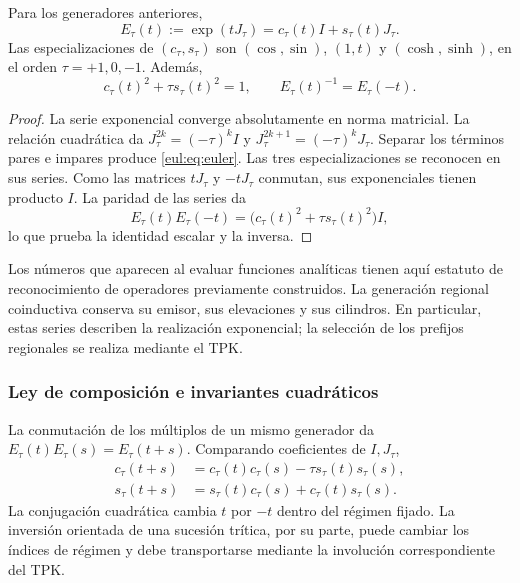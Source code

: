 \begin{teorema}
\label{eul:teo:euler}
Para los generadores anteriores,
\begin{equation}
 E_\tau(t):=\exp(tJ_\tau)
 =c_\tau(t)I+s_\tau(t)J_\tau.
\label{eul:eq:euler}
\end{equation}
Las especializaciones de \((c_\tau,s_\tau)\) son
\((\cos,\sin)\), \((1,t)\) y \((\cosh,\sinh)\), en el orden
\(\tau=+1,0,-1\). Además,
\[
 c_\tau(t)^2+\tau s_\tau(t)^2=1,
 \qquad E_\tau(t)^{-1}=E_\tau(-t).
\]
\end{teorema}
\begin{proof}
La serie exponencial converge absolutamente en norma matricial.
La relación cuadrática da
\(J_\tau^{2k}=(-\tau)^kI\) y
\(J_\tau^{2k+1}=(-\tau)^kJ_\tau\). Separar los términos pares e
impares produce \eqref{eul:eq:euler}. Las tres especializaciones se
reconocen en sus series. Como las matrices \(tJ_\tau\) y \(-tJ_\tau\)
conmutan, sus exponenciales tienen producto \(I\). La paridad de las
series da
\[
 E_\tau(t)E_\tau(-t)
 =\bigl(c_\tau(t)^2+\tau s_\tau(t)^2\bigr)I,
\]
lo que prueba la identidad escalar y la inversa.
\end{proof}

Los números que aparecen al evaluar funciones analíticas tienen aquí
estatuto de reconocimiento de operadores previamente construidos.
La generación regional coinductiva conserva su emisor, sus elevaciones
y sus cilindros. En particular, estas series describen la realización
exponencial; la selección de los prefijos regionales se realiza mediante
el TPK.

\subsubsection{Ley de composición e invariantes cuadráticos}

La conmutación de los múltiplos de un mismo generador da
\(E_\tau(t)E_\tau(s)=E_\tau(t+s)\). Comparando coeficientes de
\(I,J_\tau\),
\begin{align}
 c_\tau(t+s)&=c_\tau(t)c_\tau(s)-\tau s_\tau(t)s_\tau(s),\\
 s_\tau(t+s)&=s_\tau(t)c_\tau(s)+c_\tau(t)s_\tau(s).
\end{align}
La conjugación cuadrática cambia \(t\) por \(-t\) dentro del régimen
fijado. La inversión orientada de una sucesión trítica, por su parte,
puede cambiar los índices de régimen y debe transportarse mediante la
involución correspondiente del TPK.

